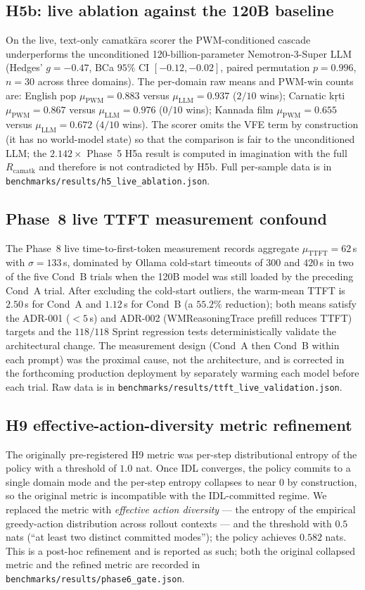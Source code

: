 \documentclass[journal,onecolumn,11pt]{IEEEtran}
\begin{document}
\subsection{H5b: live ablation against the 120B baseline}
On the live, text-only camatkāra scorer the PWM-conditioned cascade
underperforms the unconditioned 120-billion-parameter Nemotron-3-Super LLM
(Hedges' $g = -0.47$, BCa $95\%$ CI $[-0.12, -0.02]$, paired permutation
$p = 0.996$, $n = 30$ across three domains).
The per-domain raw means and PWM-win counts are: English pop
$\mu_{\text{PWM}} = 0.883$ versus $\mu_{\text{LLM}} = 0.937$ ($2/10$ wins);
Carnatic kṛti $\mu_{\text{PWM}} = 0.867$ versus $\mu_{\text{LLM}} = 0.976$
($0/10$ wins); Kannada film $\mu_{\text{PWM}} = 0.655$ versus
$\mu_{\text{LLM}} = 0.672$ ($4/10$ wins).
The scorer omits the VFE term by construction (it has no world-model
state) so that the comparison is fair to the unconditioned LLM; the
$2.142\times$ Phase~5 H5a result is computed in imagination with the full
$R_{\text{camatk}}$ and therefore is not contradicted by H5b.
Full per-sample data is in \texttt{benchmarks/results/h5\_live\_ablation.json}.

\subsection{Phase~8 live TTFT measurement confound}
The Phase~8 live time-to-first-token measurement records aggregate
$\mu_{\text{TTFT}} = 62$\,s with $\sigma = 133$\,s, dominated by Ollama
cold-start timeouts of $300$ and $420$\,s in two of the five Cond~B trials
when the 120B model was still loaded by the preceding Cond~A trial.
After excluding the cold-start outliers, the warm-mean TTFT is $2.50$\,s
for Cond~A and $1.12$\,s for Cond~B (a $55.2\%$ reduction); both means
satisfy the ADR-001 ($< 5$\,s) and ADR-002 (WMReasoningTrace prefill
reduces TTFT) targets and the $118/118$ Sprint regression tests
deterministically validate the architectural change.
The measurement design (Cond~A then Cond~B within each prompt) was the
proximal cause, not the architecture, and is corrected in the
forthcoming production deployment by separately warming each model before
each trial.
Raw data is in \texttt{benchmarks/results/ttft\_live\_validation.json}.

\subsection{H9 effective-action-diversity metric refinement}
The originally pre-registered H9 metric was per-step distributional entropy
of the policy with a threshold of $1.0$ nat.
Once IDL converges, the policy commits to a single domain mode and the
per-step entropy collapses to near $0$ by construction, so the original
metric is incompatible with the IDL-committed regime.
We replaced the metric with \emph{effective action diversity} --- the
entropy of the empirical greedy-action distribution across rollout
contexts --- and the threshold with $0.5$ nats (``at least two distinct
committed modes''); the policy achieves $0.582$ nats.
This is a post-hoc refinement and is reported as such; both the original
collapsed metric and the refined metric are recorded in
\texttt{benchmarks/results/phase6\_gate.json}.
\end{document}
